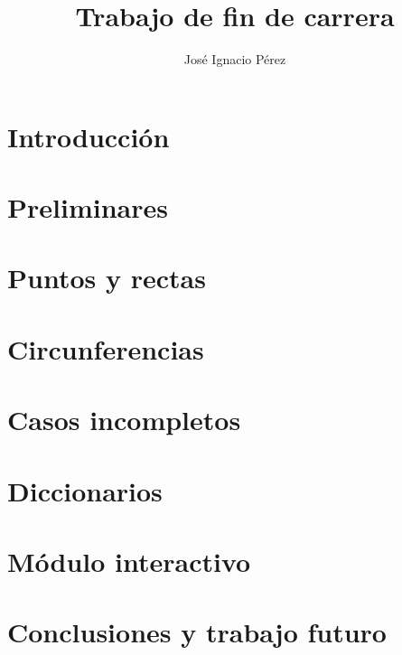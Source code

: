 \documentclass[12pt,a4paper,draft]{book}
\author{Jos\'e Ignacio P\'erez}
\title{Trabajo de fin de carrera}
\begin{document}
\newcommand{\codesize}{\small}

\frontmatter
\tableofcontents

\mainmatter
\chapter{Introducción}\label{ch:intro}

\chapter{Preliminares}\label{cap.0}

%
\chapter{Puntos y rectas}\label{cap.2}

\chapter{Circunferencias}\label{cap.3}

\chapter{Casos incompletos}\label{cap.4}

\chapter{Diccionarios}\label{cap.5}

%
\chapter{Módulo interactivo}\label{cap.7}

\chapter{Conclusiones y trabajo futuro}\label{cap.10}

\backmatter

\end{document}
